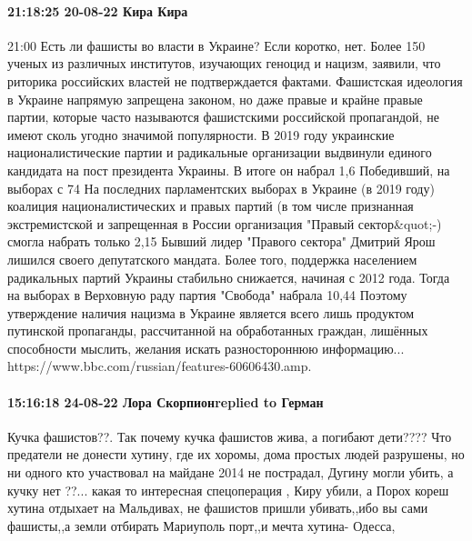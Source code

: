  
 
 
 
 

\paragraph{21:18:25 20-08-22 Кира Кира}

21:00
Есть ли фашисты во власти в Украине?
Если коротко, нет.
Более 150 ученых из различных институтов, изучающих геноцид и нацизм, заявили, что риторика российских властей не подтверждается фактами.
Фашистская идеология в Украине напрямую запрещена законом, но даже правые и крайне правые партии, которые часто называются фашистскими российской пропагандой, не имеют сколь угодно значимой популярности.
В 2019 году украинские националистические партии и радикальные организации выдвинули единого кандидата на пост президента Украины. В итоге он набрал 1,6%
Победивший, на выборах с 74%
На последних парламентских выборах в Украине (в 2019 году) коалиция националистических и правых партий (в том числе признанная экстремистской и запрещенная в России организация "Правый сектор&quot;-) смогла набрать только 2,15%
Бывший лидер "Правого сектора" Дмитрий Ярош лишился своего депутатского мандата.
Более того, поддержка населением радикальных партий Украины стабильно снижается, начиная с 2012 года. Тогда на выборах в Верховную раду партия "Свобода" набрала 10,44%
Поэтому утверждение наличия нацизма в Украине является всего лишь продуктом путинской пропаганды, рассчитанной на обработанных граждан, лишённых способности мыслить, желания искать разностороннюю информацию...
https://www.bbc.com/russian/features-60606430.amp.

\paragraph{15:16:18 24-08-22 Лора Скорпионreplied to Герман}

Кучка фашистов??. Так почему кучка фашистов жива, а погибают дети???? Что
предатели не донести хутину, где их хоромы, дома простых людей разрушены, но ни
одного кто участвовал на майдане 2014 не пострадал, Дугину могли убить, а кучку
нет ??... какая то интересная спецоперация , Киру убили, а Порох кореш хутина
отдыхает на Мальдивах, не фашистов пришли убивать,,ибо вы сами фашисты,,а земли
отбирать Мариуполь порт,,и мечта хутина- Одесса,

